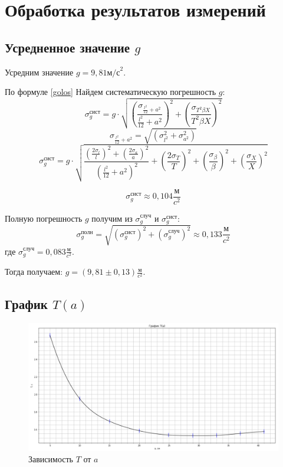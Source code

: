 \documentclass[a4paper,12pt]{article}
\begin{document}
 	\section{Обработка результатов измерений}
 	\subsection{Усредненное значение $g$}
 	Усредним значение $g = 9,81 \text{м/с}^2$. 
 	
 	По формуле \eqref{golos} Найдем систематическую погрешность $g$:
 	\begin{equation}
 		\sigma_g^\text{сист} = g\cdot \sqrt{\left(\frac{\sigma_{\frac{l^2}{12}+a^2}}{\frac{l^2}{12}+a^2}\right)^2+\left(\frac{\sigma_{T^2 \beta X}}{T^2\beta X}\right)^2}
 	\end{equation}
 	\begin{equation}
 		\sigma_{\frac{l^2}{12}+a^2} = \sqrt{\left(\sigma_{l^2}^2+\sigma_{a^2}^2 \right)}
 	\end{equation}
	\begin{equation}
 			\sigma_g^\text{сист} =  g\cdot\sqrt{\frac{\left(\frac{2\sigma_l}{l} \right)^2 + \left(\frac{2\sigma_a}{a}\right)^2}{\left(\frac{l^2}{12}+a^2 \right)^2} + \left(\frac{2\sigma_T}{T}\right)^2+\left(\frac{\sigma_{\beta}}{\beta} \right)^2 + \left(\frac{\sigma_{X}}{X} \right)^2}		
 	\end{equation}
 	
 	
 	\begin{equation}
 		\sigma_g^\text{сист} \approx 0,104 \frac{\text{м}}{c^2}
 	\end{equation}
 	
 	
 	Полную погрешность $g$ получим из $\sigma_g^\text{случ}$ и $\sigma_g^\text{сист}$:
 	\begin{equation}
 		\sigma_g^\text{полн} = \sqrt{(\sigma_g^\text{сист})^2+(\sigma_g^\text{случ})^2}\approx 0,133\frac{\text{м}}{c^2}	\end{equation}	
 	где $\sigma_g^\text{случ} = 0,083 \frac{\text{м}}{c^2}   $.
 	
 	Тогда получаем: $g=\left( 9,81\pm 0,13\right) \frac{\text{м}}{c^2}$.
 	
 	\subsection{График $T(a)$}
 	\begin{figure}[h!]
 		\includegraphics[scale=0.53]{graph}
 		\caption{Зависимость $ T $ от $ a $}
 		\label{graph}
 	\end{figure}
 	
\end{document}
